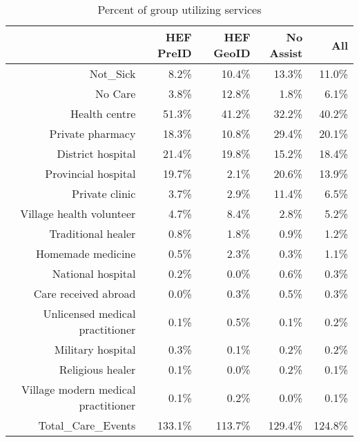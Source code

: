 \begin{table}[ht]
\centering
\begin{tabular}{rrrrr}
  \hline
 & HEF PreID & HEF GeoID & No Assist & All \\ 
  \hline
Not\_Sick & 8.2\% & 10.4\% & 13.3\% & 11.0\% \\ 
  No Care & 3.8\% & 12.8\% & 1.8\% & 6.1\% \\ 
  Health centre & 51.3\% & 41.2\% & 32.2\% & 40.2\% \\ 
  Private pharmacy & 18.3\% & 10.8\% & 29.4\% & 20.1\% \\ 
  District hospital & 21.4\% & 19.8\% & 15.2\% & 18.4\% \\ 
  Provincial hospital & 19.7\% & 2.1\% & 20.6\% & 13.9\% \\ 
  Private clinic & 3.7\% & 2.9\% & 11.4\% & 6.5\% \\ 
  Village health volunteer & 4.7\% & 8.4\% & 2.8\% & 5.2\% \\ 
  Traditional healer & 0.8\% & 1.8\% & 0.9\% & 1.2\% \\ 
  Homemade medicine & 0.5\% & 2.3\% & 0.3\% & 1.1\% \\ 
  National hospital & 0.2\% & 0.0\% & 0.6\% & 0.3\% \\ 
  Care received abroad & 0.0\% & 0.3\% & 0.5\% & 0.3\% \\ 
  Unlicensed medical practitioner & 0.1\% & 0.5\% & 0.1\% & 0.2\% \\ 
  Military hospital & 0.3\% & 0.1\% & 0.2\% & 0.2\% \\ 
  Religious healer & 0.1\% & 0.0\% & 0.2\% & 0.1\% \\ 
  Village modern medical practitioner & 0.1\% & 0.2\% & 0.0\% & 0.1\% \\ 
  Total\_Care\_Events & 133.1\% & 113.7\% & 129.4\% & 124.8\% \\ 
   \hline
\end{tabular}
\caption{Percent of group utilizing services} 
\end{table}
